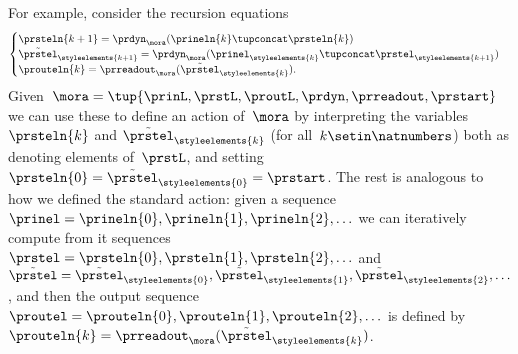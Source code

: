 For example, consider the recursion equations
\begin{equation}
    \label{eq:moore-new-recursion-equations}
    \begin{cases}
        \prsteln{k+1} = \prdyn_\mora(\prineln{k} \tupconcat \prsteln{k})                                                           \\
        \tilde{\prstel}_{\styleelements{k+1}} = \prdyn_\mora(\prinel_{\styleelements{k}} \tupconcat \prstel_{\styleelements{k+1}}) \\
        \prouteln{k}   = \prreadout_\mora(\tilde{\prstel}_{\styleelements{k}}).
    \end{cases}
\end{equation}
Given~$\mora = \tup{\prinL,\prstL,\proutL,\prdyn,\prreadout,\prstart}$ we can use these to define an action of~$\mora$ by interpreting the variables~$\prsteln{k}$ and $\tilde{\prstel}_\styleelements{k}$ (for all~$k \setin \natnumbers$) both as denoting elements of~$\prstL$, and setting~$\prsteln{0} = \tilde{\prstel}_\styleelements{0} = \prstart$.
The rest is analogous to how we defined the standard action:
given a sequence~$\prinel = \prineln{0}, \prineln{1}, \prineln{2}, \ldots$ we can iteratively compute from it sequences~$\prstel = \prsteln{0}, \prsteln{1}, \prsteln{2}, \ldots$ and~$\tilde \prstel = \tilde{\prstel}_\styleelements{0}, \tilde{\prstel}_\styleelements{1}, \tilde{\prstel}_\styleelements{2}, \ldots$, and then the output sequence~$\proutel = \prouteln{0}, \prouteln{1}, \prouteln{2}, \ldots$ is defined by~$\prouteln{k}   = \prreadout_\mora(\tilde{\prstel}_{\styleelements{k}})$.

